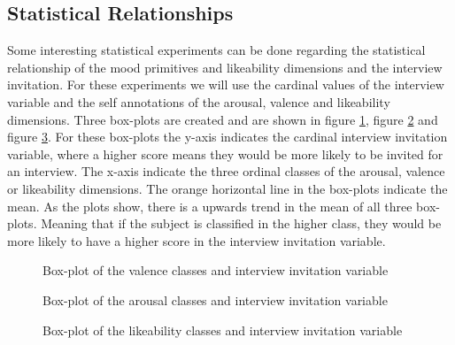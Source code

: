 \subsection{Statistical Relationships}

Some interesting statistical experiments can be done regarding the statistical relationship of the mood primitives and likeability dimensions and the interview invitation. For these experiments we will use the cardinal values of the interview variable and the self annotations of the arousal, valence and likeability dimensions. Three box-plots are created and are shown in figure \ref{fig:boxplotval}, figure \ref{fig:boxplotaro} and figure \ref{fig:boxplotlike}. For these box-plots the y-axis indicates the cardinal interview invitation variable, where a higher score means they would be more likely to be invited for an interview. The x-axis indicate the three ordinal classes of the arousal, valence or likeability dimensions. The orange horizontal line in the box-plots indicate the mean. As the plots show, there is a upwards trend in the mean of all three box-plots. Meaning that if the subject is classified in the higher class, they would be more likely to have a higher score in the interview invitation variable.

\begin{figure}[h]
  \centering
  
  \caption{Box-plot of the valence classes and interview invitation variable}
  \label{fig:boxplotval}
\end{figure}

\begin{figure}[h]
  \centering
  
  \caption{Box-plot of the arousal classes and interview invitation variable}
  \label{fig:boxplotaro}
\end{figure}

\begin{figure}[h]
  \centering
  
  \caption{Box-plot of the likeability classes and interview invitation variable}
  \label{fig:boxplotlike}
\end{figure}

